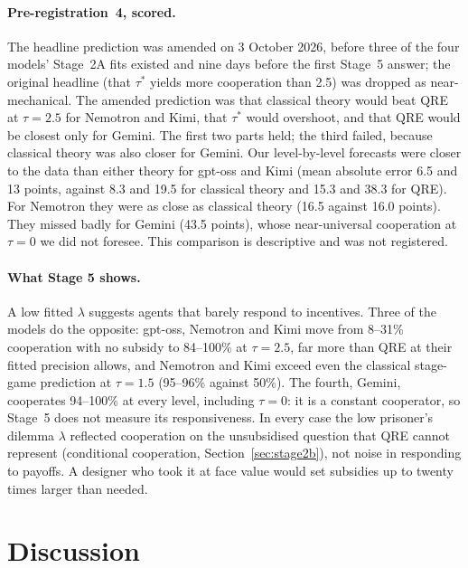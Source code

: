 \documentclass[10pt]{article}
\theoremstyle{definition}
\theoremstyle{remark}
\newcommand{\lam}{\lambda}
\begin{document}
\paragraph{Pre-registration~4, scored.} The headline prediction was amended on 3 October 2026,
before three of the four models' Stage~2A fits existed and nine days before the first Stage~5
answer; the original headline (that $\tau^*$ yields more cooperation than 2.5) was dropped as
near-mechanical. The amended prediction was that classical theory would beat QRE at $\tau=2.5$
for Nemotron and Kimi, that $\tau^*$ would overshoot, and
that QRE would be closest only for Gemini. The first two parts held; the third failed, because
classical theory was also closer for Gemini. Our level-by-level forecasts were closer
to the data than either theory for gpt-oss and Kimi (mean absolute error 6.5 and 13 points,
against 8.3 and 19.5 for classical theory and 15.3 and 38.3 for QRE). For Nemotron they were as
close as classical theory (16.5 against 16.0 points). They missed badly for Gemini (43.5 points),
whose near-universal cooperation at $\tau=0$ we did not foresee. This comparison
is descriptive and was not registered.

\paragraph{What Stage 5 shows.} A low fitted $\lam$ suggests agents that barely respond to
incentives. Three of the models do the opposite: gpt-oss, Nemotron and Kimi move from 8--31\%
cooperation with no subsidy to 84--100\% at $\tau=2.5$, far more than QRE at their fitted
precision allows, and Nemotron and Kimi exceed even the classical stage-game prediction at
$\tau=1.5$ (95--96\% against 50\%). The fourth, Gemini, cooperates 94--100\% at every level,
including $\tau=0$: it is a constant cooperator, so Stage~5 does not measure its responsiveness.
In every case the low prisoner's dilemma $\lam$ reflected cooperation on the unsubsidised question
that QRE cannot represent (conditional cooperation, Section~\ref{sec:stage2b}), not noise in
responding to payoffs. A designer who took it at face value would set subsidies up to twenty
times larger than needed.

\section{Discussion}\label{sec:discussion}
\end{document}

